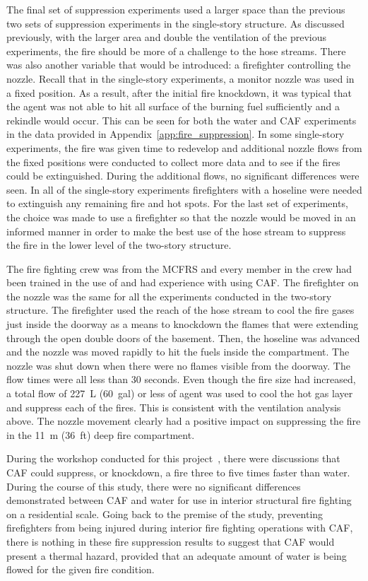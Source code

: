 \documentclass[12pt,oneside]{book}
\begin{document}
The final set of suppression experiments used a larger space than the previous two sets of suppression experiments in the single-story structure. As discussed previously, with the larger area and double the ventilation of the previous experiments, the fire should be more of a challenge to the hose streams. There was also another variable that would be introduced: a firefighter controlling the nozzle. Recall that in the single-story experiments, a monitor nozzle was used in a fixed position. As a result, after the initial fire knockdown, it was typical that the agent was not able to hit all surface of the burning fuel sufficiently and a rekindle would occur. This can be seen for both the water and CAF experiments in the data provided in Appendix~\ref{app:fire_suppression}. In some single-story experiments, the fire was given time to redevelop and additional nozzle flows from the fixed positions were conducted to collect more data and to see if the fires could be extinguished. During the additional flows, no significant differences were seen. In all of the single-story experiments firefighters with a hoseline were needed to extinguish any remaining fire and hot spots. For the last set of experiments, the choice was made to use a firefighter so that the nozzle would be moved in an informed manner in order to make the best use of the hose stream to suppress the fire in the lower level of the two-story structure.  

The fire fighting crew was from the MCFRS and every member in the crew had been trained in the use of and had experience with using CAF. The firefighter on the nozzle was the same for all the experiments conducted in the two-story structure. The firefighter used the reach of the hose stream to cool the fire gases just inside the doorway as a means to knockdown the flames that were extending through the open double doors of the basement. Then, the hoseline was advanced and the nozzle was moved rapidly to hit the fuels inside the compartment. The nozzle was shut down when there were no flames visible from the doorway. The flow times were all less than 30 seconds. Even though the fire size had increased, a total flow of 227~L (60~gal) or less of agent was used to cool the hot gas layer and suppress each of the fires. This is consistent with the ventilation analysis above. The nozzle movement clearly had a positive impact on suppressing the fire in the 11~m (36~ft) deep fire compartment.    

During the workshop conducted for this project~\cite{Grant:2011}, there were discussions that CAF could suppress, or knockdown, a fire three to five times faster than water. During the course of this study, there were no significant differences demonstrated between CAF and water for use in interior structural fire fighting on a residential scale. Going back to the premise of the study, preventing firefighters from being injured during interior fire fighting operations with CAF, there is nothing in these fire suppression results to suggest that CAF would present a thermal hazard, provided that an adequate amount of water is being flowed for the given fire condition.
\end{document}

